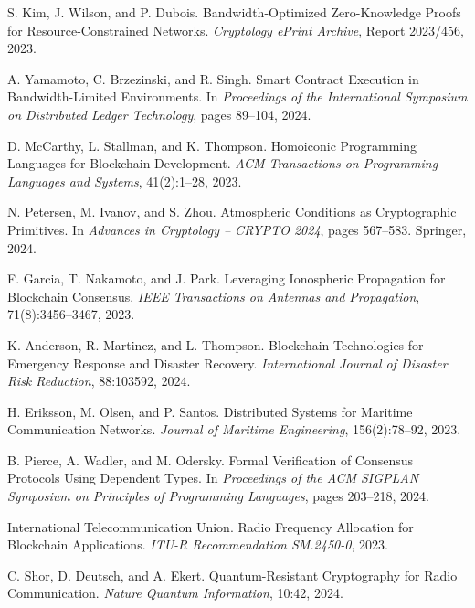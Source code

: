 \documentclass[11pt,a4paper]{article}
\begin{document}
\begin{thebibliography}{99}
S. Kim, J. Wilson, and P. Dubois.
\newblock Bandwidth-Optimized Zero-Knowledge Proofs for Resource-Constrained Networks.
\newblock \emph{Cryptology ePrint Archive}, Report 2023/456, 2023.

A. Yamamoto, C. Brzezinski, and R. Singh.
\newblock Smart Contract Execution in Bandwidth-Limited Environments.
\newblock In \emph{Proceedings of the International Symposium on Distributed Ledger Technology}, pages 89--104, 2024.

D. McCarthy, L. Stallman, and K. Thompson.
\newblock Homoiconic Programming Languages for Blockchain Development.
\newblock \emph{ACM Transactions on Programming Languages and Systems}, 41(2):1--28, 2023.

N. Petersen, M. Ivanov, and S. Zhou.
\newblock Atmospheric Conditions as Cryptographic Primitives.
\newblock In \emph{Advances in Cryptology -- CRYPTO 2024}, pages 567--583. Springer, 2024.

F. Garcia, T. Nakamoto, and J. Park.
\newblock Leveraging Ionospheric Propagation for Blockchain Consensus.
\newblock \emph{IEEE Transactions on Antennas and Propagation}, 71(8):3456--3467, 2023.

K. Anderson, R. Martinez, and L. Thompson.
\newblock Blockchain Technologies for Emergency Response and Disaster Recovery.
\newblock \emph{International Journal of Disaster Risk Reduction}, 88:103592, 2024.

H. Eriksson, M. Olsen, and P. Santos.
\newblock Distributed Systems for Maritime Communication Networks.
\newblock \emph{Journal of Maritime Engineering}, 156(2):78--92, 2023.

B. Pierce, A. Wadler, and M. Odersky.
\newblock Formal Verification of Consensus Protocols Using Dependent Types.
\newblock In \emph{Proceedings of the ACM SIGPLAN Symposium on Principles of Programming Languages}, pages 203--218, 2024.

International Telecommunication Union.
\newblock Radio Frequency Allocation for Blockchain Applications.
\newblock \emph{ITU-R Recommendation SM.2450-0}, 2023.

C. Shor, D. Deutsch, and A. Ekert.
\newblock Quantum-Resistant Cryptography for Radio Communication.
\newblock \emph{Nature Quantum Information}, 10:42, 2024.

\end{thebibliography}
\end{document}
